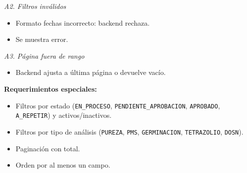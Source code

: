 \vspace{0.3em}
\noindent\textit{A2. Filtros inválidos}
\begin{itemize}[nosep]
    \item Formato fechas incorrecto: backend rechaza.
    \item Se muestra error.
\end{itemize}

\vspace{0.3em}
\noindent\textit{A3. Página fuera de rango}
\begin{itemize}[nosep]
    \item Backend ajusta a última página o devuelve vacío.
\end{itemize}

\vspace{0.5em}
\noindent\textbf{Requerimientos especiales:}
\begin{itemize}[nosep]
    \item Filtros por estado (\texttt{EN\_PROCESO}, \texttt{PENDIENTE\_APROBACION}, \texttt{APROBADO}, \texttt{A\_REPETIR}) y activos/inactivos.
    \item Filtros por tipo de análisis (\texttt{PUREZA}, \texttt{PMS}, \texttt{GERMINACION}, \texttt{TETRAZOLIO}, \texttt{DOSN}).
    \item Paginación con total.
    \item Orden por al menos un campo.
\end{itemize}
